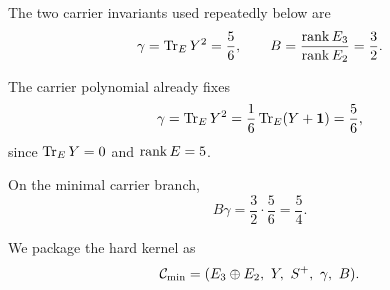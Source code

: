 The two carrier invariants used repeatedly below are
\[
\gamma=\operatorname{Tr}_EY^2=\frac56,
\qquad
B=\frac{\operatorname{rank} E_3}{\operatorname{rank} E_2}=\frac32.
\]
\begin{corollary}
The carrier polynomial already fixes
\[
\gamma=\operatorname{Tr}_EY^2=\frac16\operatorname{Tr}_E(Y+\mathbf 1)=\frac56,
\]
since $\operatorname{Tr}_EY=0$ and $\operatorname{rank} E=5$.
\end{corollary}

\begin{corollary}
\label{cor:minimal-carrier-compression}
On the minimal carrier branch,
\[
B\gamma=\frac32\cdot\frac56=\frac54.
\]
\end{corollary}

We package the hard kernel as
\[
\Cmin=(E_3\oplus E_2,\ Y,\ S^+,\ \gamma,\ B).
\]

